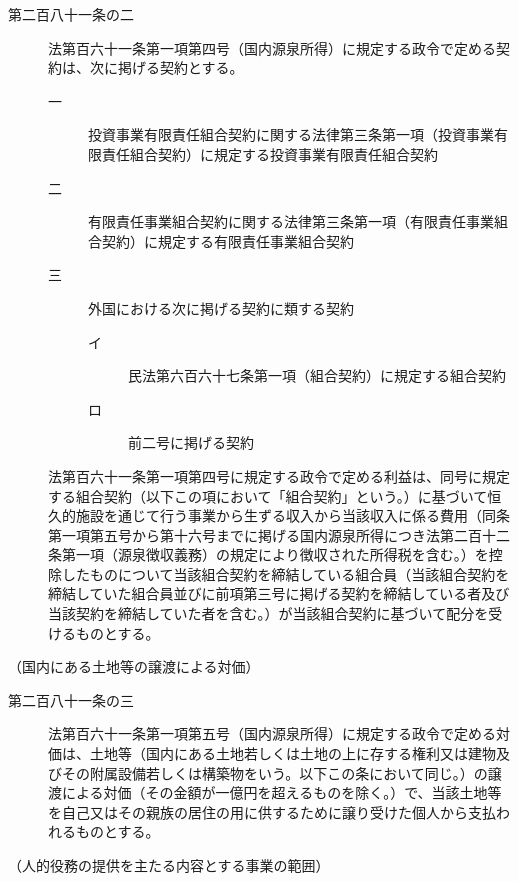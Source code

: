 \documentclass[twocolumn,a4j,10pt]{ltjtarticle}
\begin{document}
\begin{description}
\item[第二百八十一条の二]法第百六十一条第一項第四号（国内源泉所得）に規定する政令で定める契約は、次に掲げる契約とする。
\begin{description}
\item[一]投資事業有限責任組合契約に関する法律第三条第一項（投資事業有限責任組合契約）に規定する投資事業有限責任組合契約
\item[二]有限責任事業組合契約に関する法律第三条第一項（有限責任事業組合契約）に規定する有限責任事業組合契約
\item[三]外国における次に掲げる契約に類する契約
\begin{description}
\item[イ]民法第六百六十七条第一項（組合契約）に規定する組合契約
\item[ロ]前二号に掲げる契約
\end{description}
\end{description}
\item[]法第百六十一条第一項第四号に規定する政令で定める利益は、同号に規定する組合契約（以下この項において「組合契約」という。）に基づいて恒久的施設を通じて行う事業から生ずる収入から当該収入に係る費用（同条第一項第五号から第十六号までに掲げる国内源泉所得につき法第二百十二条第一項（源泉徴収義務）の規定により徴収された所得税を含む。）を控除したものについて当該組合契約を締結している組合員（当該組合契約を締結していた組合員並びに前項第三号に掲げる契約を締結している者及び当該契約を締結していた者を含む。）が当該組合契約に基づいて配分を受けるものとする。
\end{description}
\noindent\hspace{10pt}（国内にある土地等の譲渡による対価）
\begin{description}
\item[第二百八十一条の三]法第百六十一条第一項第五号（国内源泉所得）に規定する政令で定める対価は、土地等（国内にある土地若しくは土地の上に存する権利又は建物及びその附属設備若しくは構築物をいう。以下この条において同じ。）の譲渡による対価（その金額が一億円を超えるものを除く。）で、当該土地等を自己又はその親族の居住の用に供するために譲り受けた個人から支払われるものとする。
\end{description}
\noindent\hspace{10pt}（人的役務の提供を主たる内容とする事業の範囲）
\end{document}
